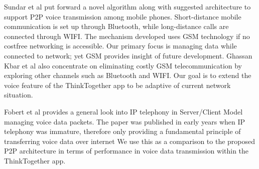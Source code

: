 Sundar et al \cite{SMPM_VoIP_ICAESM12} put forward a novel algorithm along with 
suggested architecture 
to support P2P voice transmission among mobile phones.  Short-distance mobile 
communication is set up through Bluetooth, while long-distance calls are 
connected through WIFI. The mechanism developed uses GSM technology if no 
costfree networking is accessible. Our primary focus is managing data while 
connected to network; yet GSM provides insight of future development.  Ghassan 
Kbar et al \cite{GWA_P2P_VoIP_ICWMC10} also concentrate on eliminating costly 
GSM telecommunication by 
exploring other channels such as Bluetooth and WIFI.  Our goal is to extend the 
voice feature of the ThinkTogether app to be adaptive of current network 
situation.
 
Fobert et al \cite{JSPS_USPatent05} provides a general look into IP telephony 
in Server/Client 
Model managing voice data packets.  The paper was published in early years when 
IP telephony was immature, therefore only providing a fundamental principle of 
transferring voice data over internet  We use this as a comparison to the 
proposed P2P architecture in terms of performance in voice data transmission 
within the ThinkTogether app.




